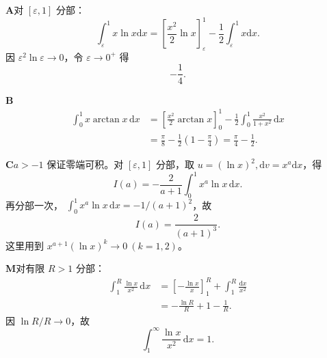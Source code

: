 \begin{solutionBox}
\textbf{A}\quad 对 \([\varepsilon,1]\) 分部：
\[
\int_\varepsilon^1x\ln x\mathrm dx
=\left[\frac{x^2}{2}\ln x\right]_\varepsilon^1
-\frac12\int_\varepsilon^1x\mathrm dx.
\]
因 \(\varepsilon^2\ln\varepsilon\to0\)，令
\(\varepsilon\to0^+\) 得
\[
\boxed{-\frac14}.
\]
\end{solutionBox}
\begin{solutionBox}
\textbf{B}\quad
\[
\begin{aligned}
\int_0^1x\arctan x\,\mathrm dx
&=\left[\frac{x^2}{2}\arctan x\right]_0^1
-\frac12\int_0^1\frac{x^2}{1+x^2}\,\mathrm dx\\
&=\frac\pi8-\frac12\left(1-\frac\pi4\right)
=\frac\pi4-\frac12.
\end{aligned}
\]
\end{solutionBox}
\begin{solutionBox}
\textbf{C}\quad \(a>-1\) 保证零端可积。对
\([\varepsilon,1]\) 分部，取
\(u=(\ln x)^2,\mathrm dv=x^a\mathrm dx\)，得
\[
I(a)=-\frac2{a+1}\int_0^1x^a\ln x\,\mathrm dx.
\]
再分部一次，
\(\int_0^1x^a\ln x\,\mathrm dx=-1/(a+1)^2\)，故
\[
\boxed{I(a)=\frac2{(a+1)^3}}.
\]
这里用到 \(x^{a+1}(\ln x)^k\to0\ (k=1,2)\)。
\end{solutionBox}
\begin{solutionBox}
\textbf{M}\quad 对有限 \(R>1\) 分部：
\[
\begin{aligned}
\int_1^R\frac{\ln x}{x^2}\,\mathrm dx
&=\left[-\frac{\ln x}{x}\right]_1^R
+\int_1^R\frac{\mathrm dx}{x^2}\\
&=-\frac{\ln R}{R}+1-\frac1R.
\end{aligned}
\]
因 \(\ln R/R\to0\)，故
\[
\boxed{\int_1^\infty\frac{\ln x}{x^2}\,\mathrm dx=1}.
\]
\end{solutionBox}

